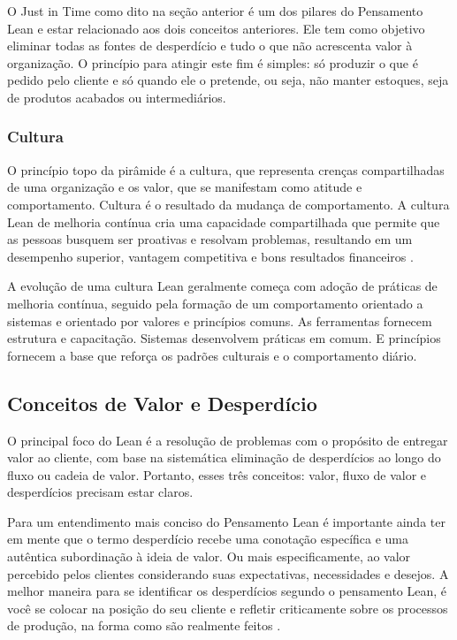 O Just in Time como dito na seção anterior é um dos pilares do Pensamento Lean e estar relacionado aos dois conceitos anteriores. Ele tem como objetivo eliminar todas as fontes de desperdício e tudo o que não acrescenta valor à organização. O princípio para atingir este fim é simples: só produzir o que é pedido pelo cliente e só quando ele o pretende, ou seja, não manter estoques, seja de produtos acabados ou intermediários. 

\subsubsection[Cultura]{Cultura}

O princípio topo da pirâmide é a cultura, que representa crenças compartilhadas de uma organização e os valor, que se manifestam como atitude e comportamento. Cultura é o resultado da mudança de comportamento. A cultura Lean de melhoria contínua cria uma capacidade compartilhada que permite que as pessoas busquem ser proativas e resolvam problemas, resultando em um desempenho superior, vantagem competitiva e bons resultados financeiros \cite{bell2011}.

A evolução de uma cultura Lean geralmente começa com adoção de práticas de melhoria contínua, seguido pela formação de um comportamento orientado a sistemas e orientado por valores e princípios comuns. As ferramentas fornecem estrutura e capacitação. Sistemas desenvolvem práticas em comum. E princípios fornecem a base que reforça os padrões culturais e o comportamento diário.

\subsection[Conceitos de Valor e Desperdício]{Conceitos de Valor e Desperdício}

O principal foco do Lean é a resolução de problemas com o propósito de entregar valor ao cliente, com base na sistemática eliminação de desperdícios ao longo do fluxo ou cadeia de valor. Portanto, esses três conceitos: valor, fluxo de valor e desperdícios precisam estar claros.

Para um entendimento mais conciso do Pensamento Lean é importante ainda ter em mente que o termo desperdício recebe uma conotação específica e uma autêntica subordinação à ideia de valor. Ou mais especificamente, ao valor percebido pelos clientes considerando suas expectativas, necessidades e desejos. A melhor maneira para se identificar os desperdícios segundo o pensamento Lean, é você se colocar na posição do seu cliente e refletir criticamente sobre os processos de produção, na forma como são realmente feitos \cite{costa2010}.

